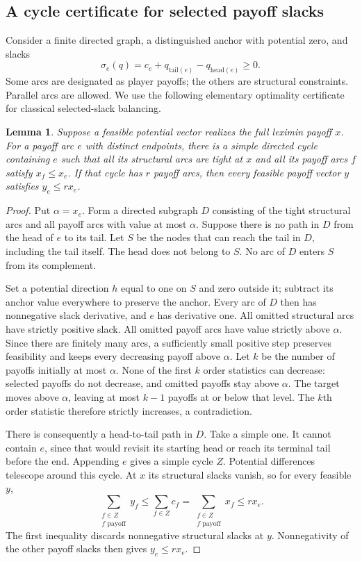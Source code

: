 \documentclass[11pt]{article}
\newtheorem{lemma}[theorem]{Lemma}
\theoremstyle{remark}\newtheorem{remark}[theorem]{Remark}
\begin{document}
\subsection{A cycle certificate for selected payoff slacks}
Consider a finite directed graph, a distinguished anchor with potential
zero, and slacks
\[
       \sigma_e(q)=c_e+q_{\mathrm{tail}(e)}-q_{\mathrm{head}(e)}\geq0.
\]
Some arcs are designated as player payoffs; the others are structural
constraints. Parallel arcs are allowed. We use the following elementary
optimality certificate for classical selected-slack balancing.

\begin{lemma}\label{lem:cycle}
Suppose a feasible potential vector realizes the full leximin payoff $x$.
For a payoff arc $e$ with distinct endpoints, there is a simple directed
cycle containing $e$ such that all its structural arcs are tight at $x$
and all its payoff arcs $f$ satisfy $x_f\leq x_e$. If that cycle has $r$
payoff arcs, then every feasible payoff vector $y$ satisfies $y_e\leq r x_e$.
\end{lemma}
\begin{proof}
Put $\alpha=x_e$. Form a directed subgraph $D$ consisting of the tight
structural arcs and all payoff arcs with value at most $\alpha$. Suppose
there is no path in $D$ from the head of $e$ to its tail. Let $S$ be the
nodes that can reach the tail in $D$, including the tail itself. The head
does not belong to $S$. No arc of $D$ enters $S$ from its complement.

Set a potential direction $h$ equal to one on $S$ and zero outside it;
subtract its anchor value everywhere to preserve the anchor. Every arc
of $D$ then has nonnegative slack derivative, and $e$ has derivative one.
All omitted structural arcs have strictly positive slack. All omitted
payoff arcs have value strictly above $\alpha$. Since there are finitely
many arcs, a sufficiently small positive step preserves feasibility and
keeps every decreasing payoff above $\alpha$. Let $k$ be the number of
payoffs initially at most $\alpha$. None of the first $k$ order statistics
can decrease: selected payoffs do not decrease, and omitted payoffs stay
above $\alpha$. The target moves above $\alpha$, leaving at most $k-1$
payoffs at or below that level. The $k$th order statistic therefore
strictly increases, a contradiction.

There is consequently a head-to-tail path in $D$. Take a simple one.
It cannot contain $e$, since that would revisit its starting head or
reach its terminal tail before the end. Appending $e$ gives a simple
cycle $Z$. Potential differences telescope around this cycle. At $x$
its structural slacks vanish, so for every feasible $y$,
\[
 \sum_{\substack{f\in Z\\f\text{ payoff}}}y_f
 \leq\sum_{f\in Z}c_f
 =\sum_{\substack{f\in Z\\f\text{ payoff}}}x_f
 \leq r x_e.
\]
The first inequality discards nonnegative structural slacks at $y$.
Nonnegativity of the other payoff slacks then gives $y_e\leq r x_e$.
\end{proof}
\end{document}
